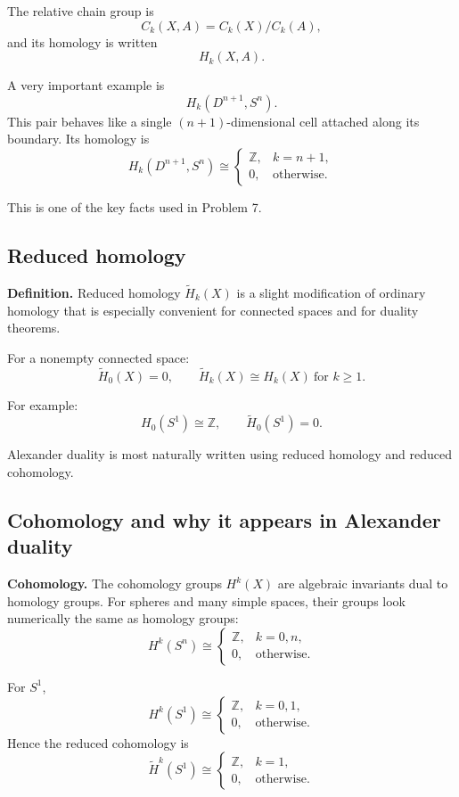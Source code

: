 \documentclass[12pt,a4paper]{article}
\theoremstyle{notespace}
\begin{document}
The relative chain group is
\[
C_k(X,A)=C_k(X)/C_k(A),
\]
and its homology is written
\[
H_k(X,A).
\]

A very important example is
\[
H_k(D^{n+1},S^n).
\]
This pair behaves like a single \((n+1)\)-dimensional cell attached along its boundary. Its homology is
\[
H_k(D^{n+1},S^n)\cong
\begin{cases}
	\mathbb Z, & k=n+1,\\
	0, & \text{otherwise}.
\end{cases}
\]

This is one of the key facts used in Problem 7.

\subsection{Reduced homology}

\textbf{Definition.}
Reduced homology \(\widetilde H_k(X)\) is a slight modification of ordinary homology that is especially convenient for connected spaces and for duality theorems.

For a nonempty connected space:
\[
\widetilde H_0(X)=0,
\qquad
\widetilde H_k(X)\cong H_k(X)\ \text{for }k\ge 1.
\]

For example:
\[
H_0(S^1)\cong \mathbb Z,
\qquad
\widetilde H_0(S^1)=0.
\]

Alexander duality is most naturally written using reduced homology and reduced cohomology.

\subsection{Cohomology and why it appears in Alexander duality}

\textbf{Cohomology.}
The cohomology groups \(H^k(X)\) are algebraic invariants dual to homology groups. For spheres and many simple spaces, their groups look numerically the same as homology groups:
\[
H^k(S^n)\cong
\begin{cases}
	\mathbb Z, & k=0,n,\\
	0, & \text{otherwise}.
\end{cases}
\]

For \(S^1\),
\[
H^k(S^1)\cong
\begin{cases}
	\mathbb Z, & k=0,1,\\
	0, & \text{otherwise}.
\end{cases}
\]
Hence the reduced cohomology is
\[
\widetilde H^k(S^1)\cong
\begin{cases}
	\mathbb Z, & k=1,\\
	0, & \text{otherwise}.
\end{cases}
\]
\end{document}
